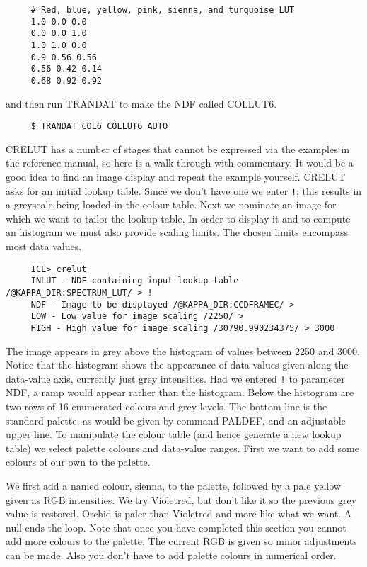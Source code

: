 {\small
\begin{verbatim}
     # Red, blue, yellow, pink, sienna, and turquoise LUT
     1.0 0.0 0.0
     0.0 0.0 1.0
     1.0 1.0 0.0
     0.9 0.56 0.56
     0.56 0.42 0.14
     0.68 0.92 0.92
\end{verbatim}
\normalsize
and then run TRANDAT to make the NDF called COLLUT6.

\small
\begin{verbatim}
     $ TRANDAT COL6 COLLUT6 AUTO
\end{verbatim}
\normalsize

CRELUT has a number of stages that cannot be expressed via the
examples in the reference manual, so here is a walk through with
commentary.  It would be a good idea to find an image display and
repeat the example yourself. CRELUT asks for an initial lookup table.
Since we don't have one we enter {\tt !}; this results in a greyscale
being loaded in the colour table.  Next we nominate an image for which
we want to tailor the lookup table.  In order to display it and to
compute an histogram we must also provide scaling limits. The chosen
limits encompass most data values.

\small
\begin{verbatim}
     ICL> crelut
     INLUT - NDF containing input lookup table /@KAPPA_DIR:SPECTRUM_LUT/ > !
     NDF - Image to be displayed /@KAPPA_DIR:CCDFRAMEC/ >
     LOW - Low value for image scaling /2250/ >
     HIGH - High value for image scaling /30790.990234375/ > 3000
\end{verbatim}
\normalsize
The image appears in grey above the histogram of values between 2250 and
3000.  Notice that the histogram shows the appearance of data values
given along the data-value axis, currently just grey intensities.  Had
we entered {\tt !} to parameter NDF, a ramp would appear rather than the
histogram. Below the histogram are two rows of 16 enumerated colours and
grey levels.  The bottom line is the standard palette, as would be given
by command PALDEF, and an adjustable upper line. To manipulate the
colour table (and hence generate a new lookup table) we select palette
colours and data-value ranges.  First we want to add some colours of our
own to the palette.

We first add a named colour, sienna, to the palette, followed by a pale
yellow given as RGB intensities.  We try Violetred, but don't like it
so the previous grey value is restored.  Orchid is paler than Violetred
and more like what we want.  A null ends the loop.  Note that once you
have completed this section you cannot add more colours to the palette.
The current RGB is given so minor adjustments can be made.  Also you
don't have to add palette colours in numerical order.

}
